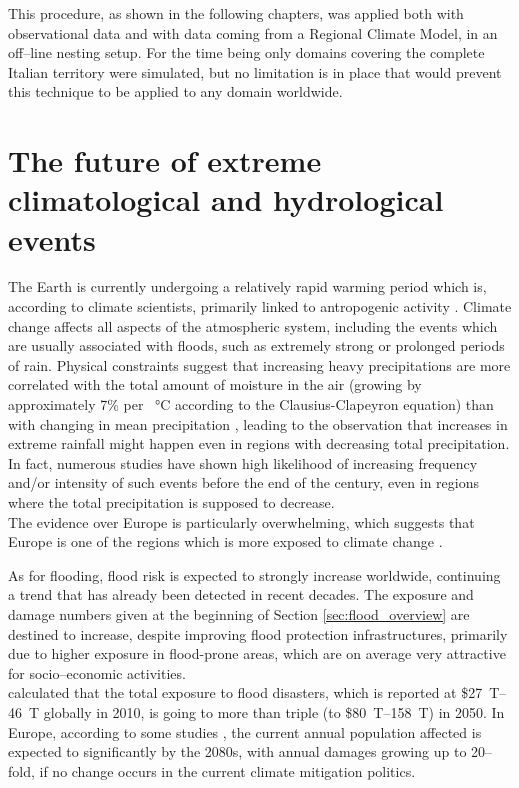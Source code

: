 This procedure, as shown in the following chapters, was applied both with observational data and with data coming from a Regional Climate Model, in an off--line nesting setup. For the time being only domains covering the complete Italian territory were simulated, but no limitation is in place that would prevent this technique to be applied to any domain worldwide.


\section{The future of extreme climatological and hydrological events}
The Earth is currently undergoing a relatively rapid warming period which is, according to climate scientists, primarily linked to antropogenic activity \citep{Anderegg2010, IPCC2013}. Climate change affects all aspects of the atmospheric system, including the events which are usually associated with floods, such as extremely strong or prolonged periods of rain. Physical constraints suggest that increasing heavy precipitations are more correlated with the total amount of moisture in the air (growing by approximately 7\% per \SI{}{\celsius} according to the Clausius-Clapeyron equation) than with changing in mean precipitation \citep{Allen2002}, leading to the observation that increases in extreme rainfall might happen even in regions with decreasing total precipitation. In fact, numerous studies \citep[e.g.][]{Frei2006a, Christensen2004, Rajczak2013a, Pal2004, Durman2001, KleinTank2003, Fowler2003} have shown high likelihood of increasing frequency and/or intensity of such events before the end of the century, even in regions where the total precipitation is supposed to decrease.\\
The evidence over Europe is particularly overwhelming, which suggests that Europe is one of the regions which is more exposed to climate change \citep{giorgi2006Clichahot}.

As for flooding, flood risk is expected to strongly increase worldwide, continuing a trend that has already been detected in recent decades. The exposure and damage numbers given at the beginning of Section \ref{sec:flood_overview} are destined to increase, despite improving flood protection infrastructures, primarily due to higher exposure \citep{MunichRE2015, Kron2005, Hirabayashi2009, Mitchell2003} in flood-prone areas, which are on average very attractive for socio--economic activities.\\
\citet{Jongman2012} calculated that the total exposure to flood disasters, which is reported at \$\SIrange{27}{46}{T} globally in 2010, is going to more than triple (to \$\SIrange{80}{158}{T}) in 2050. In Europe, according to some studies \citep{Rojas2013, Alfieri2015}, the current annual population affected is expected to significantly by the 2080s, with annual damages growing up to 20--fold, if no change occurs in the current climate mitigation politics.

